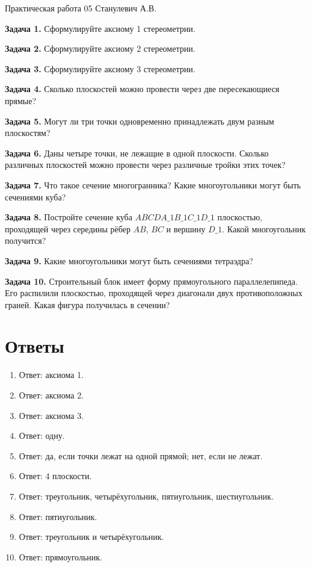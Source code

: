 \documentclass{umk-matematika}
\begin{document}
\maketitlepage
    {Практическая работа 05}
    {}
    {Станулевич А.В.}

\textbf{Задача 1.} Сформулируйте аксиому 1 стереометрии.\par\vspace{10pt}
\textbf{Задача 2.} Сформулируйте аксиому 2 стереометрии.\par\vspace{10pt}
\textbf{Задача 3.} Сформулируйте аксиому 3 стереометрии.\par\vspace{10pt}
\textbf{Задача 4.} Сколько плоскостей можно провести через две пересекающиеся прямые?\par\vspace{10pt}
\textbf{Задача 5.} Могут ли три точки одновременно принадлежать двум разным плоскостям?\par\vspace{10pt}
\textbf{Задача 6.} Даны четыре точки, не лежащие в одной плоскости. Сколько различных плоскостей можно провести через различные тройки этих точек?\par\vspace{10pt}
\textbf{Задача 7.} Что такое сечение многогранника? Какие многоугольники могут быть сечениями куба?\par\vspace{10pt}
\textbf{Задача 8.} Постройте сечение куба $ABCDA\_1B\_1C\_1D\_1$ плоскостью, проходящей через середины рёбер $AB$, $BC$ и вершину $D\_1$. Какой многоугольник получится?\par\vspace{10pt}
\textbf{Задача 9.} Какие многоугольники могут быть сечениями тетраэдра?\par\vspace{10pt}
\textbf{Задача 10.} Строительный блок имеет форму прямоугольного параллелепипеда. Его распилили плоскостью, проходящей через диагонали двух противоположных граней. Какая фигура получилась в сечении?\par\vspace{10pt}
\newpage
\section*{Ответы}

\begin{enumerate}
  \item Ответ: аксиома 1.
  \item Ответ: аксиома 2.
  \item Ответ: аксиома 3.
  \item Ответ: одну.
  \item Ответ: да, если точки лежат на одной прямой; нет, если не лежат.
  \item Ответ: 4 плоскости.
  \item Ответ: треугольник, четырёхугольник, пятиугольник, шестиугольник.
  \item Ответ: пятиугольник.
  \item Ответ: треугольник и четырёхугольник.
  \item Ответ: прямоугольник.
\end{enumerate}
\end{document}
